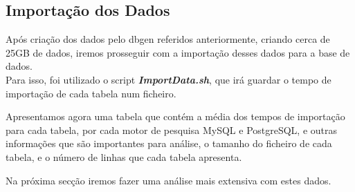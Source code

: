 \documentclass{article}
\begin{document}
\subsection{Importação dos Dados}
\texttt{}\par Após criação dos dados pelo dbgen referidos anteriormente, criando cerca de 25GB de dados, iremos prosseguir com a importação desses dados para a base de dados. \\
Para isso, foi utilizado o script \textbf{\textit{ImportData.sh}}, que irá guardar o tempo de importação de cada tabela num ficheiro. \\
\texttt{}\par Apresentamos agora uma tabela que contém a média dos tempos de importação para cada tabela, por cada motor de pesquisa MySQL e PostgreSQL, e outras informações que são importantes para análise, o tamanho do ficheiro de cada tabela, e o número de linhas que cada tabela apresenta.
\texttt{}\par Na próxima secção iremos fazer uma análise mais extensiva com estes dados.\\
\begin{table}[H]
    \centering
    \renewcommand{\arraystretch}{1.7}
    \caption{Tempo de importação com 25GB de base de dados. Informações acerca de cada tabela.}
    \label{tab:BC_Table1}
  \end{table}
\end{document}
